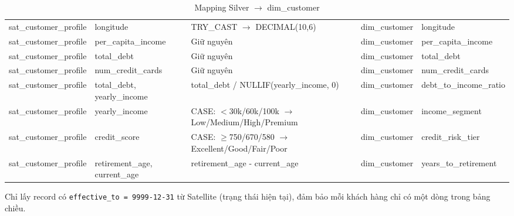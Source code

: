 \begin{table}[H]
{\begin{tabular}{lllll}
sat\_customer\_profile & longitude                 & TRY\_CAST $\rightarrow$ DECIMAL(10,6)                     & dim\_customer & longitude              \\
sat\_customer\_profile & per\_capita\_income       & Giữ nguyên                                    & dim\_customer & per\_capita\_income    \\
sat\_customer\_profile & total\_debt               & Giữ nguyên                                    & dim\_customer & total\_debt            \\
sat\_customer\_profile & num\_credit\_cards        & Giữ nguyên                                    & dim\_customer & num\_credit\_cards     \\
sat\_customer\_profile & total\_debt, yearly\_income & total\_debt / NULLIF(yearly\_income, 0)     & dim\_customer & debt\_to\_income\_ratio \\
sat\_customer\_profile & yearly\_income            & CASE: $<$30k/60k/100k $\rightarrow$ Low/Medium/High/Premium & dim\_customer & income\_segment        \\
sat\_customer\_profile & credit\_score             & CASE: $\geq$750/670/580 $\rightarrow$ Excellent/Good/Fair/Poor & dim\_customer & credit\_risk\_tier     \\
sat\_customer\_profile & retirement\_age, current\_age & retirement\_age - current\_age            & dim\_customer & years\_to\_retirement  \\
\hline
\end{tabular}
}
\caption{Mapping Silver $\rightarrow$ dim\_customer}
\end{table}

Chỉ lấy record có \texttt{effective\_to = 9999-12-31} từ Satellite (trạng
thái hiện tại), đảm bảo mỗi khách hàng chỉ có một dòng trong bảng chiều.

